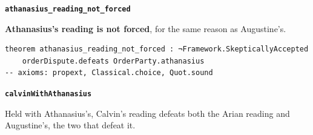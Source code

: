 \documentclass[11pt,paper=\testimonypaper,DIV=13,parskip=false]{scrartcl}
\begin{document}
\par\medskip\noindent\textbf{\texttt{athanasius\_\allowbreak{}reading\_\allowbreak{}not\_\allowbreak{}forced}}\par\nobreak\noindent
\textbf{Athanasius’s reading is not forced}, for the same reason as Augustine’s.

{\small\begin{verbatim}
theorem athanasius_reading_not_forced : ¬Framework.SkepticallyAccepted
    orderDispute.defeats OrderParty.athanasius
-- axioms: propext, Classical.choice, Quot.sound
\end{verbatim}}
\par\medskip\noindent\textbf{\texttt{calvin\allowbreak{}With\allowbreak{}Athanasius}}\par\nobreak\noindent
Held with Athanasius’s, Calvin’s reading defeats both the Arian reading and Augustine’s, the two that defeat it.
\end{document}
